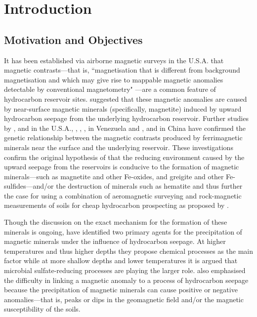 
\chapter{Introduction}

\section{Motivation and Objectives}

It has been established via airborne magnetic surveys in the U.S.A. \citep{Donovan} that magnetic contrasts---that is, ``magnetisation that is different from background magnetisation and which may give rise to mappable magnetic anomalies detectable by conventional magnetometry" \citep{Machel}---are a common feature of hydrocarbon reservoir sites. \citet{Donovan} suggested that these magnetic anomalies are caused by near-surface magnetic minerals (specifically, magnetite) induced by upward hydrocarbon seepage from the underlying hydrocarbon reservoir. Further studies by \citet{Donovan2}, \citet{Reynolds} and \citet{Elmore} in the U.S.A., \citet{Diaz}, \citet{Costanzo}, \citet{Guzman}, \citet{Gonzalez} in Venezuela and \citet{Liu3}, \citet{Liu2} and \citet{Liu} in China have confirmed the genetic relationship between the magnetic contrasts produced by ferrimagnetic minerals near the surface and the underlying reservoir. These investigations confirm the original hypothesis of \citet{Donovan} that the reducing environment caused by the upward seepage from the reservoirs is conducive to the formation of magnetic minerals---such as magnetite and other Fe-oxides, and greigite and other Fe-sulfides---and/or the destruction of minerals such as hematite \citep{Machel} and thus further the case for using a combination of aeromagnetic surveying and rock-magnetic measurements of soils for cheap hydrocarbon prospecting as proposed by \citet{Donovan2}.\par

Though the discussion on the exact mechanism for the formation of these minerals is ongoing, \citet{Machel} have identified two primary agents for the precipitation of magnetic minerals under the influence of hydrocarbon seepage. At higher temperatures and thus higher depths they propose chemical processes as the main factor while at more shallow depths and lower temperatures it is argued that microbial sulfate-reducing processes are playing the larger role. \citet{Machel} also emphasised the difficulty in linking a magnetic anomaly to a process of hydrocarbon seepage because the precipitation of magnetic minerals can cause positive or negative anomalies---that is, peaks or dips in the geomagnetic field and/or the magnetic susceptibility of the soils.\par

